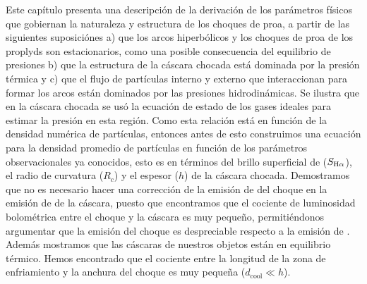 % 



% 


\label{chap:theori}

Este capítulo presenta una descripción de la derivación de los parámetros físicos que gobiernan la naturaleza y estructura de los choques de proa, a partir de las siguientes suposiciónes a) que los arcos hiperbólicos y los choques de proa de los proplyds son estacionarios, como una posible consecuencia del equilibrio de presiones b) que la estructura de la cáscara chocada está dominada por la presión térmica y c) que el flujo de partículas interno y externo que interaccionan para formar los arcos están dominados por las presiones hidrodinámicas. Se ilustra que en la cáscara chocada se usó la ecuación de estado de los gases ideales para estimar la presión en esta región. Como esta relación está en función de la densidad numérica de partículas, entonces antes de esto construimos una ecuación para la densidad promedio de partículas en función de los parámetros observacionales ya conocidos, esto es en términos del brillo superficial de \ha{} (\(S_{\mathrm{H}\alpha{}}\)), el radio de curvatura (\(R_{c}\)) y el espesor (\(h\)) de la cáscara chocada. Demostramos que no es necesario hacer una corrección de la emisión de \ha{} del choque en la emisión de \ha{} de la cáscara, puesto que encontramos que el cociente de luminosidad bolométrica entre el choque y la cáscara es muy pequeño, permitiéndonos argumentar que la emisión del choque es despreciable respecto a la emisión de \ha{}. Además mostramos que las cáscaras de nuestros objetos están en equilibrio térmico. Hemos encontrado que el cociente entre la longitud de la zona de enfriamiento y la anchura del choque es muy pequeña (\(d_{\text{cool}} \ll h\)).  \\ 

